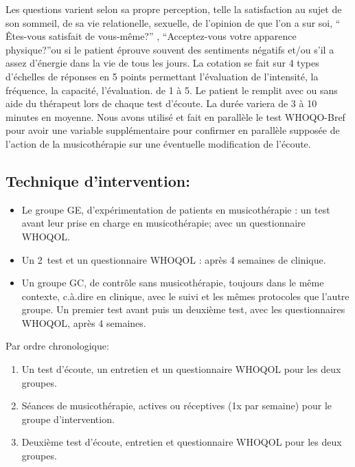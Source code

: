 Les questions varient selon sa propre perception, telle la satisfaction
au sujet de son  sommeil, de sa vie relationelle, sexuelle, de
l'opinion de que l'on a sur soi,  `` Êtes-vous satisfait de
vous-même?'' , ``Acceptez-vous votre apparence physique?''ou si le patient éprouve souvent des sentiments négatifs
et/ou s'il a assez d'énergie dans la vie de tous les jours.
La cotation se fait sur 4 types d'échelles de réponses en 5 points
permettant l'évaluation de l'intensité, la fréquence, la capacité, l'évaluation.
de 1 à 5.
Le patient le remplit avec ou sans aide du
thérapeut lors de chaque test
d'écoute. La durée variera de 3 à 10 minutes en
moyenne. 
Nous avons utilisé et fait en parallèle le test WHOQO-Bref pour avoir une variable supplémentaire pour confirmer en
parallèle supposée de l'action de la musicothérapie sur une éventuelle modification de l'écoute.


        	
 \subsection{Technique d'intervention:}


       
\begin{itemize}
\item Le groupe GE, d'expérimentation de patients en musicothérapie : un
          test avant leur prise en charge en musicothérapie; avec un questionnaire
          WHOQOL.
          
\item Un 2\ieme\ test et un questionnaire WHOQOL : après 4 semaines de
          clinique.
          
\item Un groupe GC, de contrôle sans musicothérapie,
	toujours dans le même contexte, c.à.dire en clinique, avec le suivi et les mêmes protocoles que l'autre groupe. Un premier test avant
 puis un deuxième test, avec les questionnaires WHOQOL, après 4 semaines. 
\end{itemize}

 Par ordre chronologique:
 
\begin{enumerate} 
   \item Un test d'écoute, un entretien et un questionnaire
        WHOQOL pour les deux groupes.
    \item Séances de musicothérapie, actives ou réceptives (1x par
        semaine) pour le groupe d'intervention.
    \item Deuxième test d'écoute, entretien et questionnaire
          WHOQOL pour les deux groupes.
\end{enumerate}

